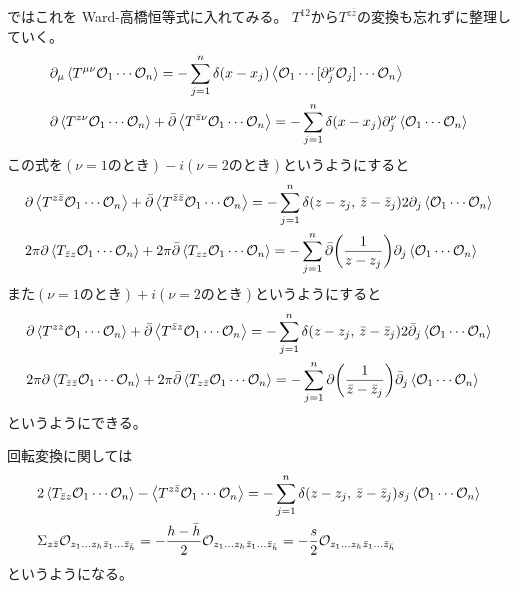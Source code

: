 \documentclass[../../master.tex]{subfiles}
\begin{document}
ではこれを Ward-高橋恒等式に入れてみる。
\(T^{12}\)から\(T^{z\bar{z}}\)の変換も忘れずに整理していく。
\begin{align}
    &\partial_\mu\ev{T^{\mu\nu}\mathcal{O}_1\cdots\mathcal{O}_n}
             = - \sum_{j=1}^n \delta(x-x_j)\ev{\mathcal{O}_1\cdots[\partial_j^\nu\mathcal{O}_j]\cdots\mathcal{O}_n}\notag\\
    &\partial\ev{T^{z\nu}\mathcal{O}_1\cdots\mathcal{O}_n}
        +\bar{\partial}\ev{T^{\bar{z}\nu}\mathcal{O}_1\cdots\mathcal{O}_n}
             = - \sum_{j=1}^n \delta(x-x_j)\partial_j^\nu\ev{\mathcal{O}_1\cdots\mathcal{O}_n}\notag
\end{align}
この式を\((\nu=1\text{のとき})-i(\nu=2\text{のとき})\)というようにすると
\begin{align}
    &\partial\ev{T^{z\bar{z}}\mathcal{O}_1\cdots\mathcal{O}_n}
        +\bar{\partial}\ev{T^{\bar{z}\bar{z}}\mathcal{O}_1\cdots\mathcal{O}_n}
             = - \sum_{j=1}^n \delta(z-z_j,\,\bar{z}-\bar{z}_j)2\partial_j\ev{\mathcal{O}_1\cdots\mathcal{O}_n}\notag\\
    &2\pi\partial\ev{T_{\bar{z}z}\mathcal{O}_1\cdots\mathcal{O}_n}
        +2\pi\bar{\partial}\ev{T_{zz}\mathcal{O}_1\cdots\mathcal{O}_n}
            = - \sum_{j=1}^n \bar{\partial}\qty(\frac{1}{z-z_j})\partial_j\ev{\mathcal{O}_1\cdots\mathcal{O}_n}
\end{align}
また\((\nu=1\text{のとき})+i(\nu=2\text{のとき})\)というようにすると
\begin{align}
    &\partial\ev{T^{zz}\mathcal{O}_1\cdots\mathcal{O}_n}
        +\bar{\partial}\ev{T^{\bar{z}z}\mathcal{O}_1\cdots\mathcal{O}_n}
             = - \sum_{j=1}^n \delta(z-z_j,\,\bar{z}-\bar{z}_j)2\bar{\partial}_j\ev{\mathcal{O}_1\cdots\mathcal{O}_n}\notag\\
    &2\pi\partial\ev{T_{\bar{z}\bar{z}}\mathcal{O}_1\cdots\mathcal{O}_n}
        +2\pi\bar{\partial}\ev{T_{z\bar{z}}\mathcal{O}_1\cdots\mathcal{O}_n}
            = - \sum_{j=1}^n \partial\qty(\frac{1}{\bar{z}-\bar{z}_j})\bar{\partial}_j\ev{\mathcal{O}_1\cdots\mathcal{O}_n}
\end{align}
というようにできる。

回転変換に関しては
\begin{align}
    &2\ev{T_{\bar{z}z}\mathcal{O}_1\cdots\mathcal{O}_n}-\ev{T^{z\bar{z}}\mathcal{O}_1\cdots\mathcal{O}_n}
        = - \sum_{j=1}^n \delta(z-z_j,\,\bar{z}-\bar{z}_j)s_j\ev{\mathcal{O}_1\cdots\mathcal{O}_n}\\
    &\Sigma_{z\bar{z}}\mathcal{O}_{z_1\dots z_h\bar{z}_1\dots \bar{z}_{\bar{h}}}
    = -\frac{h-\bar{h}}{2}\mathcal{O}_{z_1\dots z_h\bar{z}_1\dots \bar{z}_{\bar{h}}}
    = -\frac{s}{2}\mathcal{O}_{z_1\dots z_h\bar{z}_1\dots \bar{z}_{\bar{h}}}
\end{align}
というようになる。 %
\end{document}
